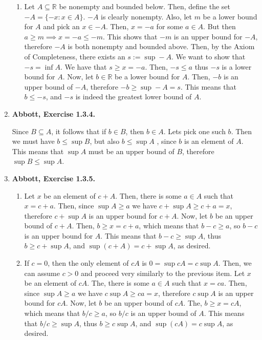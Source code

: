 \documentclass{article}
\newcommand{\R}{\mathbb{R}}
\newcommand{\exc}[2][Abbott]{\item \textbf{#1, Exercise #2.}}
\begin{document}
\begin{enumerate}
\begin{enumerate}
		\item Let $A \subseteq \R$ be nonempty and bounded below. Then, define the set $-A = \{-x: x \in A\}$. $-A$ is clearly nonempty. Also, let $m$ be a lower bound for $A$ and pick an $x \in -A$. Then, $x = -a$ for some $a \in A$. But then $a \geq m \implies x=-a \leq -m$. This shows that $-m$ is an upper bound for $-A$, therefore $-A$ is both nonempty and bounded above. Then, by the Axiom of Completeness, there exists an $s := \sup -A$. We want to show that $-s = \inf A$. We have that $s \geq x = -a$. Then, $-s \leq a$ thus $-s$ is a lower bound for $A$. Now, let $b \in \R$ be a lower bound for $A$. Then, $-b$ is an upper bound of $-A$, therefore $-b \geq \sup -A = s$. This means that $b \leq -s$, and $-s$ is indeed the greatest lower bound of $A$.
	\end{enumerate}
				      	      
	\exc{1.3.4}
				      	      
	Since $B \subseteq A$, it follows that if $b \in B$, then $b \in A$. Lets pick one such $b$. Then we must have $b \leq \sup B$, but also $b \leq \sup A$
	, since $b$ is an element of $A$. This means that $\sup A$ must be an upper bound of $B$, therefore $\sup B \leq \sup A$.
				      	      
	\exc{1.3.5}
				      	      
	\begin{enumerate}
		\item Let $x$ be an element of $c + A$. Then, there is some $a \in A$ such that $x = c + a$. Then, since $\sup A \geq a$ we have $c + \sup A \geq c + a = x$, therefore $c + \sup A$ is an upper bound for $c + A$. Now, let $b$ be an upper bound of $c + A$. Then, $b \geq x = c+a$, which means that $b - c \geq a$, so $b-c$ is an upper bound for $A$. This means that $b-c \geq \sup A$, thus $b \geq c + \sup A$, and $\sup (c+A) = c + \sup A$, as desired.
		      		      		      	      	      	      	          
		\item If $c = 0$, then the only element of $c A$ is $0 = \sup c A = c \sup A$. Then, we can assume $c > 0$ and proceed very similarly to the previous item. Let $x$ be an element of $c A$. The, there is some $a \in A$ such that $x = c a$. Then, since $\sup A \geq a$ we have $c \sup A \geq c a = x$, therefore $c \sup A$ is an upper bound for $c A$. Now, let $b$ be an upper bound of $c A$. The, $b \geq x = c A$, which means that $b/c \geq a$, so $b/c$ is an upper bound of $A$. This means that $b/c \geq \sup A$, thus $b \geq c \sup A$, and $\sup (c A) = c \sup A$, as desired.
		      		      		      	      	      	      	          

\end{enumerate}
\end{enumerate}
\end{document}
